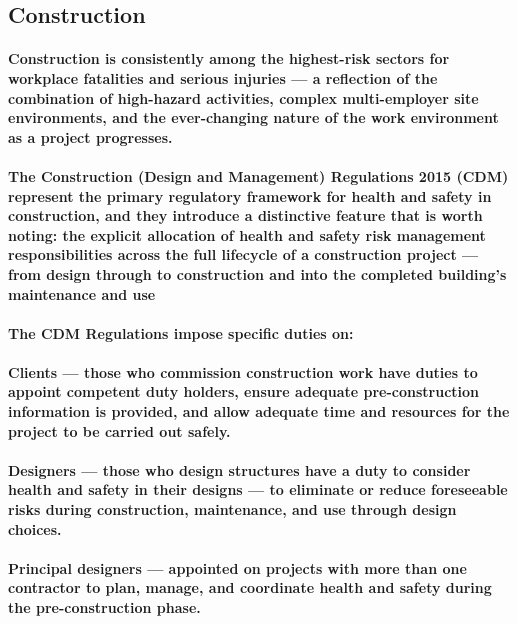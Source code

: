 \subsection{Construction}
\paragraph{Construction is consistently among the highest-risk sectors for workplace fatalities and serious injuries — a reflection of the combination of high-hazard activities, complex multi-employer site environments, and the ever-changing nature of the work environment as a project progresses.}
\paragraph{\textbf{The Construction (Design and Management) Regulations 2015 (CDM)} represent the primary regulatory framework for health and safety in construction, and they introduce a distinctive feature that is worth noting: the explicit allocation of health and safety risk management responsibilities across the full lifecycle of a construction project — from design through to construction and into the completed building's maintenance and use}
\paragraph{The CDM Regulations impose specific duties on:}
\paragraph{\textbf{Clients} — those who commission construction work have duties to appoint competent duty holders, ensure adequate pre-construction information is provided, and allow adequate time and resources for the project to be carried out safely.}
\paragraph{\textbf{Designers} — those who design structures have a duty to consider health and safety in their designs — to eliminate or reduce foreseeable risks during construction, maintenance, and use through design choices.}
\paragraph{\textbf{Principal designers} — appointed on projects with more than one contractor to plan, manage, and coordinate health and safety during the pre-construction phase.}
